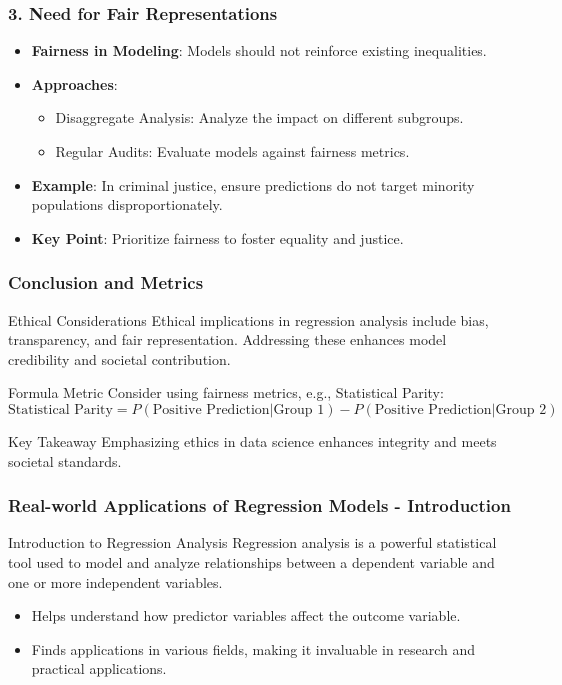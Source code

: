 \documentclass[aspectratio=169]{beamer}
\begin{document}
\begin{frame}[fragile]
    \frametitle{3. Need for Fair Representations}
    \begin{itemize}
        \item \textbf{Fairness in Modeling}: Models should not reinforce existing inequalities.
        \item \textbf{Approaches}:
        \begin{itemize}
            \item Disaggregate Analysis: Analyze the impact on different subgroups.
            \item Regular Audits: Evaluate models against fairness metrics.
        \end{itemize}
        \item \textbf{Example}: In criminal justice, ensure predictions do not target minority populations disproportionately.
        \item \textbf{Key Point}: Prioritize fairness to foster equality and justice.
    \end{itemize}
\end{frame}

\begin{frame}[fragile]
    \frametitle{Conclusion and Metrics}
    \begin{block}{Ethical Considerations}
        Ethical implications in regression analysis include bias, transparency, and fair representation. Addressing these enhances model credibility and societal contribution.
    \end{block}
    \begin{block}{Formula Metric}
        Consider using fairness metrics, e.g., Statistical Parity:
        \begin{equation}
        \text{Statistical Parity} = P(\text{Positive Prediction} |\text{Group 1}) - P(\text{Positive Prediction} |\text{Group 2})
        \end{equation}
    \end{block}
    \begin{block}{Key Takeaway}
        Emphasizing ethics in data science enhances integrity and meets societal standards.
    \end{block}
\end{frame}

\begin{frame}[fragile]
    \frametitle{Real-world Applications of Regression Models - Introduction}
    \begin{block}{Introduction to Regression Analysis}
        Regression analysis is a powerful statistical tool used to model and analyze relationships between a dependent variable and one or more independent variables. 
    \end{block}
    \begin{itemize}
        \item Helps understand how predictor variables affect the outcome variable.
        \item Finds applications in various fields, making it invaluable in research and practical applications.
    \end{itemize}
\end{frame}
\end{document}
